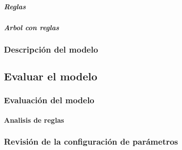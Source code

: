         \subparagraph{Reglas}
            

        \newpage
        \subparagraph{Arbol con reglas}

            \begin{figure}[ht]
            \end{figure}
            \FloatBarrier
            \newpage

    \subsubsection{Descripción del modelo}
\subsection{Evaluar el modelo}
    \subsubsection{Evaluación del modelo}
        \paragraph{Analisis de reglas}
            
    \subsubsection{Revisión de la configuración de parámetros}

